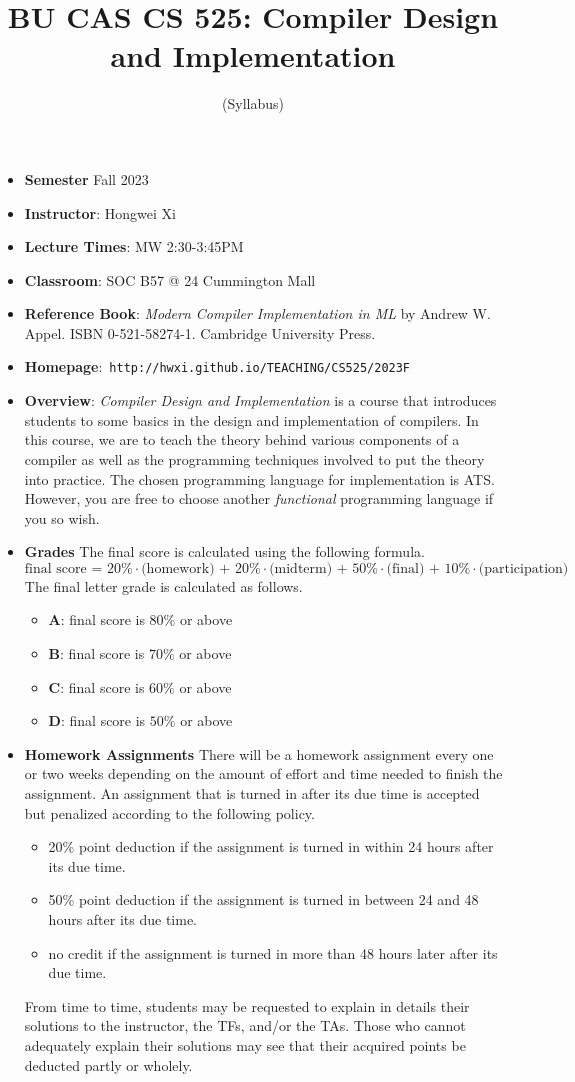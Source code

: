 \documentclass[11pt]{article}
\title{BU CAS CS 525: Compiler Design and Implementation}
\author{(Syllabus)}
\date{}
\begin{document}
\maketitle
\thispagestyle{empty}

\begin{itemize}
\item {\bf Semester} Fall 2023
\item {\bf Instructor}: Hongwei Xi
\item {\bf Lecture Times}: MW 2:30-3:45PM
\item {\bf Classroom}: SOC B57 @ 24 Cummington Mall
\item {\bf Reference Book}:\kern6pt
{\em Modern Compiler Implementation in ML} by Andrew W. Appel.  ISBN
0-521-58274-1. Cambridge University Press.
\item {\bf Homepage}:~{\tt http://hwxi.github.io/TEACHING/CS525/2023F}
\item {\bf Overview}:
{\em Compiler Design and Implementation} is a course that introduces
students to some basics in the design and implementation of compilers. In
this course, we are to teach the theory behind various components of a
compiler as well as the programming techniques involved to put the theory
into practice. The chosen programming language for implementation is
ATS. However, you are free to choose another {\em functional} programming
language if you so wish.

\item {\bf Grades}
The final score is calculated using the following formula.
\[\mbox{final score = 20\%$\cdot$(homework) + 20\%$\cdot$(midterm) + 50\%$\cdot$(final) + 10\%$\cdot$(participation)}\]
The final letter grade is calculated as follows.
\begin{itemize}
\item{\bf A}: final score is $80\%$ or above
\item{\bf B}: final score is $70\%$ or above
\item{\bf C}: final score is $60\%$ or above
\item{\bf D}: final score is $50\%$ or above
\end{itemize}

\item{\bf Homework Assignments}
There will be a homework assignment every one or two weeks depending on the
amount of effort and time needed to finish the assignment. An assignment that
is turned in after its due time is accepted but penalized according to the
following policy.
\begin{itemize}
\item 20\% point deduction if the assignment is turned in within 24 hours
after its due time.
\item 50\% point deduction if the assignment is turned in between 24 and 48 hours
after its due time.
\item no credit if the assignment is turned in more than 48 hours later after its due time.
\end{itemize}
From time to time, students may be requested to explain in details
their solutions to the instructor, the TFs, and/or the TAs. Those who
cannot adequately explain their solutions may see that their acquired
points be deducted partly or wholely.


\end{itemize}
\end{document}
